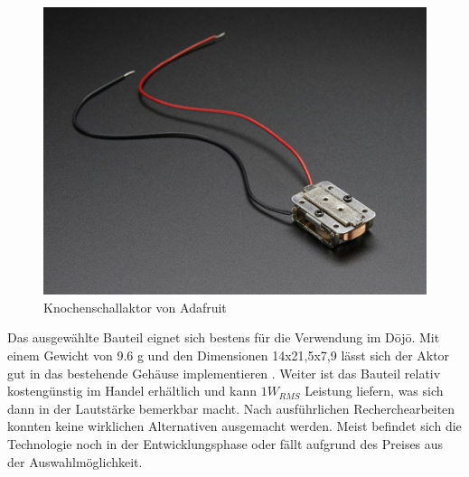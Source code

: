 \begin{figure}[H]
	\begin{center}
		\includegraphics[width=120mm]{data/KnochenschallaktorAdafruit1.jpg}
		\caption[Knochenschallaktor \cite{BoneConductorAdafruit}]{Knochenschallaktor von Adafruit} %
		\label{fig:knochenschallAda}
	\end{center}
\end{figure}

Das ausgewählte Bauteil eignet sich bestens für die Verwendung im Dōjō. Mit einem Gewicht von 9.6 g und den Dimensionen 14x21,5x7,9 lässt sich der Aktor gut in das bestehende Gehäuse implementieren \cite{BoneConductorAdafruit}. Weiter ist das Bauteil relativ kostengünstig im Handel erhältlich und kann $1W_{RMS}$ Leistung liefern, was sich dann in der Lautstärke bemerkbar macht. Nach ausführlichen Recherchearbeiten konnten keine wirklichen Alternativen ausgemacht werden. Meist befindet sich die Technologie noch in der Entwicklungsphase oder fällt aufgrund des Preises aus der Auswahlmöglichkeit.
